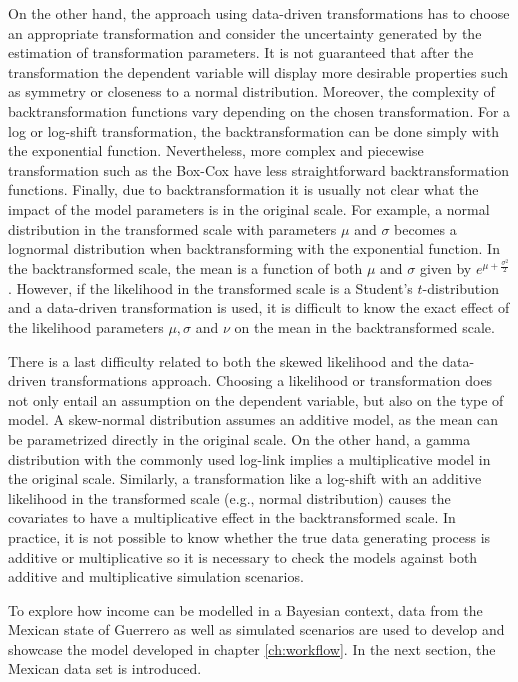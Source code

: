 On the other hand, the approach using data-driven transformations has to choose an appropriate transformation and consider the uncertainty generated by the estimation of transformation parameters.
It is not guaranteed that after the transformation the dependent variable will display more desirable properties such as symmetry or closeness to a normal distribution.
Moreover, the complexity of backtransformation functions vary depending on the chosen transformation.
For a log or log-shift transformation, the backtransformation can be done simply with the exponential function.
Nevertheless, more complex and piecewise transformation such as the Box-Cox have less straightforward backtransformation functions.
Finally, due to backtransformation it is usually not clear what the impact of the model parameters is in the original scale.
For example, a normal distribution in the transformed scale with parameters $\mu$ and $\sigma$ becomes a lognormal distribution when backtransforming with the exponential function.
In the backtransformed scale, the mean is a function of both $\mu$ and $\sigma$ given by $e^{\mu + \frac{\sigma^2}{2}}$.
However, if the likelihood in the transformed scale is a Student's $t$-distribution and a data-driven transformation is used, it is difficult to know the exact effect of the likelihood parameters $\mu, \sigma$ and $\nu$ on the mean in the backtransformed scale.

There is a last difficulty related to both the skewed likelihood and the data-driven transformations approach.
Choosing a likelihood or transformation does not only entail an assumption on the dependent variable, but also on the type of model.
A skew-normal distribution assumes an additive model, as the mean can be parametrized directly in the original scale. On the other hand, a gamma distribution with the commonly used log-link implies a multiplicative model in the original scale.
Similarly, a transformation like a log-shift with an additive likelihood in the transformed scale (e.g., normal distribution) causes the covariates to have a multiplicative effect in the backtransformed scale.
In practice, it is not possible to know whether the true data generating process is additive or multiplicative so it is necessary to check the models against both additive and multiplicative simulation scenarios.

To explore how income can be modelled in a Bayesian context, data from the Mexican state of Guerrero as well as simulated scenarios are used to develop and showcase the model developed in chapter \ref{ch:workflow}.
In the next section, the Mexican data set is introduced.

